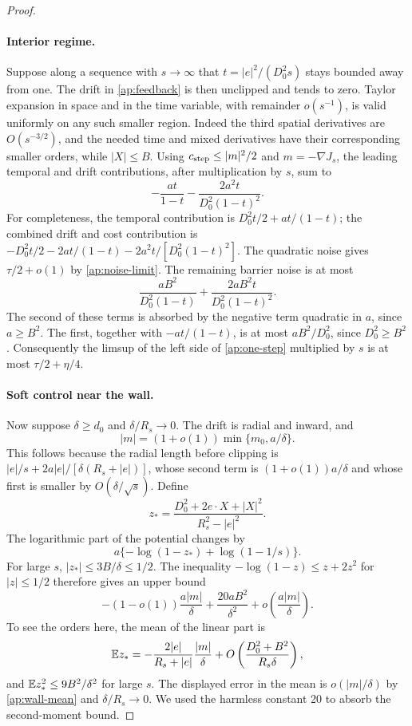 \begin{proof}
\paragraph{Interior regime.}
Suppose along a sequence with \(s\to\infty\) that
\(t=|e|^2/(D_0^2s)\) stays bounded away from one.  The drift in
\eqref{ap:feedback} is then unclipped and tends to zero.  Taylor
expansion in space and in the time variable, with remainder \(o(s^{-1})\),
is valid uniformly on any such smaller region.  Indeed the third spatial
derivatives are \(O(s^{-3/2})\), and the needed time and mixed
derivatives have their corresponding smaller orders, while \(|X|\leq B\).
Using \(c_{\rm step}\leq |m|^2/2\) and \(m=-\nabla J_s\), the leading temporal
and drift contributions, after multiplication by \(s\), sum to
\[
 -\frac{at}{1-t}
 -\frac{2a^2t}{D_0^2(1-t)^2}.
\]
For completeness, the temporal contribution is
\(D_0^2t/2+at/(1-t)\); the combined drift and cost contribution is
\(-D_0^2t/2-2at/(1-t)-2a^2t/[D_0^2(1-t)^2]\).
The quadratic noise gives \(\tau/2+o(1)\) by
\eqref{ap:noise-limit}.  The remaining barrier noise is at most
\[
 \frac{aB^2}{D_0^2(1-t)}
 +\frac{2aB^2t}{D_0^2(1-t)^2}.
\]
The second of these terms is absorbed by the negative term quadratic
in \(a\), since \(a\geq B^2\).  The first, together with
\(-at/(1-t)\), is at most \(aB^2/D_0^2\), since \(D_0^2\geq B^2\).
Consequently the limsup of the left side of \eqref{ap:one-step}
multiplied by \(s\) is at most \(\tau/2+\eta/4\).

\paragraph{Soft control near the wall.}
Now suppose \(\delta\geq d_0\) and \(\delta/R_s\to0\).  The drift
is radial and inward, and
\begin{equation}\label{ap:wall-mean}
 |m|=(1+o(1))\min\{m_0,a/\delta\}.
\end{equation}
This follows because the radial length before clipping is
\(|e|/s+2a|e|/[\delta(R_s+|e|)]\), whose second term is
\((1+o(1))a/\delta\) and whose first is smaller by
\(O(\delta/\sqrt s)\).  Define
\[
 z_*=\frac{D_0^2+2e\cdot X+|X|^2}{R_s^2-|e|^2}.
\]
The logarithmic part of the potential changes by
\[
 a\{-\log(1-z_*)+\log(1-1/s)\}.
\]
For large \(s\), \(|z_*|\leq3B/\delta\leq1/2\).  The inequality
\(-\log(1-z)\leq z+2z^2\) for \(|z|\leq1/2\) therefore gives an
upper bound
\begin{equation}\label{ap:wall-barrier}
 -(1-o(1))\frac{a|m|}{\delta}
 +\frac{20aB^2}{\delta^2}
 +o\left(\frac{a|m|}{\delta}\right).
\end{equation}
To see the orders here, the mean of the linear part is
\[
 \mathbb E z_*
 =-\frac{2|e|}{R_s+|e|}\frac{|m|}{\delta}
   +O\left(\frac{D_0^2+B^2}{R_s\delta}\right),
\]
and \(\mathbb E z_*^2\leq9B^2/\delta^2\) for large \(s\).
The displayed error in the mean is
\(o(|m|/\delta)\) by \eqref{ap:wall-mean} and
\(\delta/R_s\to0\).  We used the harmless constant 20 to absorb
the second-moment bound.


\end{proof}
